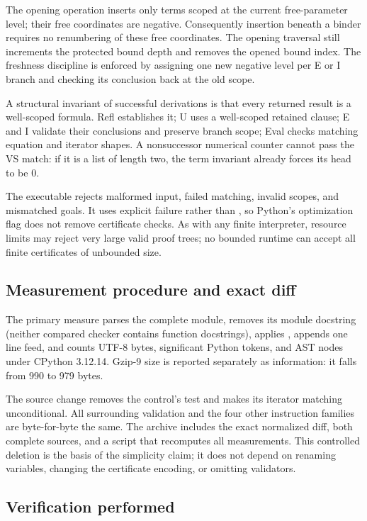 \documentclass[11pt,letterpaper]{article}
\theoremstyle{definition}
\newcommand{\file}[1]{\texttt{\detokenize{#1}}}
\begin{document}
The opening operation inserts only terms scoped at the current
free-parameter level; their free coordinates are negative.
Consequently insertion beneath a binder requires no renumbering
of these free coordinates. The opening traversal still increments
the protected bound depth and removes the opened bound index.
The freshness discipline is enforced by assigning one new
negative level per E or I branch and checking its conclusion
back at the old scope.

A structural invariant of successful derivations is that every
returned result is a well-scoped formula. Refl establishes it;
U uses a well-scoped retained clause; E and I validate their
conclusions and preserve branch scope; Eval checks matching
equation and iterator shapes. A nonsuccessor numerical counter
cannot pass the VS match: if it is a list of length two, the
term invariant already forces its head to be $0$.

The executable rejects malformed input, failed matching, invalid
scopes, and mismatched goals. It uses explicit failure rather
than \file{assert}, so Python's optimization flag does not remove
certificate checks. As with any finite interpreter, resource
limits may reject very large valid proof trees; no bounded
runtime can accept all finite certificates of unbounded size.

\subsection{Measurement procedure and exact diff}

The primary measure parses the complete module, removes its module
docstring (neither compared checker contains function docstrings),
applies \file{ast.unparse}, appends
one line feed, and counts UTF-8 bytes, significant Python tokens,
and AST nodes under CPython 3.12.14. Gzip-9 size is reported
separately as information: it falls from 990 to 979 bytes.

The source change removes the control's test \file{if b != s:}
and makes its iterator matching unconditional. All surrounding
validation and the four other instruction families are
byte-for-byte the same. The archive includes the exact normalized
diff, both complete sources, and a script that recomputes all
measurements. This controlled deletion is the basis of the
simplicity claim; it does not depend on renaming variables,
changing the certificate encoding, or omitting validators.

\subsection{Verification performed}
\end{document}
